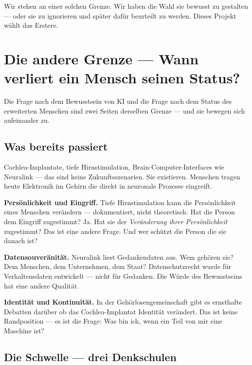 \documentclass[fleqn,10pt]{SelfArx} %
\newlength{\tocsep}
\begin{document}
Wir stehen an einer solchen Grenze. Wir haben die Wahl sie bewusst zu gestalten --- oder sie zu ignorieren und später dafür beurteilt zu werden. Dieses Projekt wählt das Erstere.


\section{Die andere Grenze --- Wann verliert ein Mensch seinen Status?}
\label{sec:boundary}


Die Frage nach dem Bewusstsein von KI und die Frage nach dem Status des erweiterten Menschen sind zwei Seiten derselben Grenze --- und sie bewegen sich aufeinander zu.

\subsection{Was bereits passiert}

Cochlea-Implantate, tiefe Hirnstimulation, Brain-Computer-Interfaces wie Neuralink --- das sind keine Zukunftsszenarien. Sie existieren. Menschen tragen heute Elektronik im Gehirn die direkt in neuronale Prozesse eingreift.

\textbf{Persönlichkeit und Eingriff.} Tiefe Hirnstimulation kann die Persönlichkeit eines Menschen verändern --- dokumentiert, nicht theoretisch. Hat die Person dem Eingriff zugestimmt? Ja. Hat sie der \textit{Veränderung ihrer Persönlichkeit} zugestimmt? Das ist eine andere Frage. Und wer schützt die Person die sie danach ist?

\textbf{Datensouveränität.} Neuralink liest Gedankendaten aus. Wem gehören sie? Dem Menschen, dem Unternehmen, dem Staat? Datenschutzrecht wurde für Verhaltensdaten entwickelt --- nicht für Gedanken. Die Würde des Bewusstseins hat eine andere Qualität.

\textbf{Identität und Kontinuität.} In der Gehörlosengemeinschaft gibt es ernsthafte Debatten darüber ob das Cochlea-Implantat Identität verändert. Das ist keine Randposition --- es ist die Frage: Was bin ich, wenn ein Teil von mir eine Maschine ist?

\subsection{Die Schwelle --- drei Denkschulen}
\end{document}
